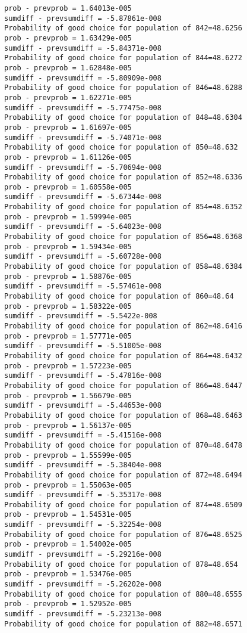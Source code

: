 \documentclass[11pt,onecolumn]{article}
\begin{document}
\begin{verbatim}
prob - prevprob = 1.64013e-005
sumdiff - prevsumdiff = -5.87861e-008
Probability of good choice for population of 842=48.6256
prob - prevprob = 1.63429e-005
sumdiff - prevsumdiff = -5.84371e-008
Probability of good choice for population of 844=48.6272
prob - prevprob = 1.62848e-005
sumdiff - prevsumdiff = -5.80909e-008
Probability of good choice for population of 846=48.6288
prob - prevprob = 1.62271e-005
sumdiff - prevsumdiff = -5.77475e-008
Probability of good choice for population of 848=48.6304
prob - prevprob = 1.61697e-005
sumdiff - prevsumdiff = -5.74071e-008
Probability of good choice for population of 850=48.632
prob - prevprob = 1.61126e-005
sumdiff - prevsumdiff = -5.70694e-008
Probability of good choice for population of 852=48.6336
prob - prevprob = 1.60558e-005
sumdiff - prevsumdiff = -5.67344e-008
Probability of good choice for population of 854=48.6352
prob - prevprob = 1.59994e-005
sumdiff - prevsumdiff = -5.64023e-008
Probability of good choice for population of 856=48.6368
prob - prevprob = 1.59434e-005
sumdiff - prevsumdiff = -5.60728e-008
Probability of good choice for population of 858=48.6384
prob - prevprob = 1.58876e-005
sumdiff - prevsumdiff = -5.57461e-008
Probability of good choice for population of 860=48.64
prob - prevprob = 1.58322e-005
sumdiff - prevsumdiff = -5.5422e-008
Probability of good choice for population of 862=48.6416
prob - prevprob = 1.57771e-005
sumdiff - prevsumdiff = -5.51005e-008
Probability of good choice for population of 864=48.6432
prob - prevprob = 1.57223e-005
sumdiff - prevsumdiff = -5.47816e-008
Probability of good choice for population of 866=48.6447
prob - prevprob = 1.56679e-005
sumdiff - prevsumdiff = -5.44653e-008
Probability of good choice for population of 868=48.6463
prob - prevprob = 1.56137e-005
sumdiff - prevsumdiff = -5.41516e-008
Probability of good choice for population of 870=48.6478
prob - prevprob = 1.55599e-005
sumdiff - prevsumdiff = -5.38404e-008
Probability of good choice for population of 872=48.6494
prob - prevprob = 1.55063e-005
sumdiff - prevsumdiff = -5.35317e-008
Probability of good choice for population of 874=48.6509
prob - prevprob = 1.54531e-005
sumdiff - prevsumdiff = -5.32254e-008
Probability of good choice for population of 876=48.6525
prob - prevprob = 1.54002e-005
sumdiff - prevsumdiff = -5.29216e-008
Probability of good choice for population of 878=48.654
prob - prevprob = 1.53476e-005
sumdiff - prevsumdiff = -5.26202e-008
Probability of good choice for population of 880=48.6555
prob - prevprob = 1.52952e-005
sumdiff - prevsumdiff = -5.23213e-008
Probability of good choice for population of 882=48.6571

\end{verbatim}
\end{document}

